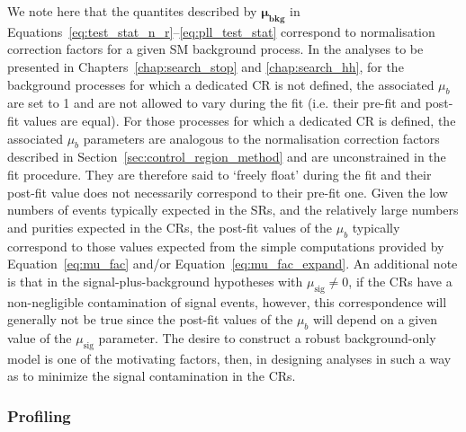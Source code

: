 We note here that the quantites described by $\bm{\mu_{\text{bkg}}}$ in Equations~\ref{eq:test_stat_n_r}--\ref{eq:pll_test_stat} correspond to normalisation correction
factors for a given SM background process.
In the analyses to be presented in Chapters~\ref{chap:search_stop} and \ref{chap:search_hh},
for the background processes for which a dedicated CR is not defined, the associated $\mu_b$ are
set to 1 and are not allowed to vary during the fit (i.e. their pre-fit and post-fit values are equal).
For those processes for which a dedicated CR is defined, the associated $\mu_b$ parameters
are analogous to the normalisation correction factors described in Section~\ref{sec:control_region_method} and
are unconstrained in the fit procedure.
They are therefore said to `freely float' during the fit and 
their post-fit value does not necessarily correspond to their pre-fit one.
Given the low numbers of events typically expected in the SRs, and the relatively
large numbers and purities expected in the CRs, the post-fit values of the $\mu_b$ typically
correspond to those values expected from the simple computations provided by Equation~\ref{eq:mu_fac}
and/or Equation~\ref{eq:mu_fac_expand}.
An additional note is that in the signal-plus-background hypotheses with $\mu_{\text{sig}} \ne 0$, if
the CRs have a non-negligible contamination of signal events, however, this correspondence will generally not be true
since the post-fit values of the $\mu_b$ will depend on a given value of the $\mu_{\text{sig}}$ parameter.
The desire to construct a robust background-only model is one of the motivating factors, then,
in designing analyses in such a way as to minimize the signal contamination in the CRs.

\subsubsection{Profiling}
\label{sec:profiling}

